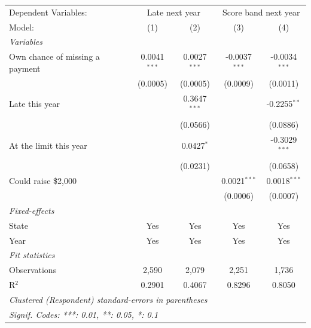
\begingroup
\centering
\begin{tabular}{lcccc}
   \tabularnewline \midrule \midrule
   Dependent Variables: & \multicolumn{2}{c}{Late next year} & \multicolumn{2}{c}{Score band next year}\\
   Model:                          & (1)            & (2)            & (3)             & (4)\\  
   \midrule
   \emph{Variables}\\
   Own chance of missing a payment & 0.0041$^{***}$ & 0.0027$^{***}$ & -0.0037$^{***}$ & -0.0034$^{***}$\\   
                                   & (0.0005)       & (0.0005)       & (0.0009)        & (0.0011)\\   
   Late this year                  &                & 0.3647$^{***}$ &                 & -0.2255$^{**}$\\   
                                   &                & (0.0566)       &                 & (0.0886)\\   
   At the limit this year          &                & 0.0427$^{*}$   &                 & -0.3029$^{***}$\\   
                                   &                & (0.0231)       &                 & (0.0658)\\   
   Could raise \$2,000             &                &                & 0.0021$^{***}$  & 0.0018$^{***}$\\   
                                   &                &                & (0.0006)        & (0.0007)\\   
   \midrule
   \emph{Fixed-effects}\\
   State                           & Yes            & Yes            & Yes             & Yes\\  
   Year                            & Yes            & Yes            & Yes             & Yes\\  
   \midrule
   \emph{Fit statistics}\\
   Observations                    & 2,590          & 2,079          & 2,251           & 1,736\\  
   R$^2$                           & 0.2901         & 0.4067         & 0.8296          & 0.8050\\  
   \midrule \midrule
   \multicolumn{5}{l}{\emph{Clustered (Respondent) standard-errors in parentheses}}\\
   \multicolumn{5}{l}{\emph{Signif. Codes: ***: 0.01, **: 0.05, *: 0.1}}\\
\end{tabular}
\par\endgroup



